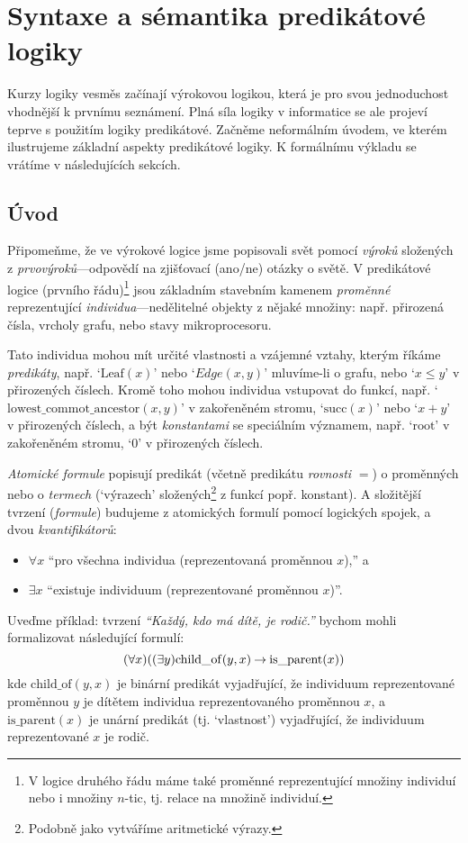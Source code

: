 \chapter{Syntaxe a sémantika predikátové logiky}

Kurzy logiky vesměs začínají výrokovou logikou, která je pro svou jednoduchost vhodnější k prvnímu seznámení. Plná síla logiky v informatice se ale projeví teprve s použitím logiky predikátové.
Začněme neformálním úvodem, ve kterém ilustrujeme základní aspekty predikátové logiky. K formálnímu výkladu se vrátíme v následujících sekcích.

\section{Úvod}
Připomeňme, že ve výrokové logice jsme popisovali svět pomocí \emph{výroků} složených z \emph{prvovýroků}---odpovědí na zjišťovací (ano/ne) otázky o světě. V predikátové logice (prvního řádu)\footnote{V logice druhého řádu máme také proměnné reprezentující množiny individuí nebo i množiny $n$-tic, tj. relace na množině individuí.} jsou základním stavebním kamenem \emph{proměnné} reprezentující \emph{individua}---nedělitelné objekty z nějaké množiny: např. přirozená čísla, vrcholy grafu, nebo stavy mikroprocesoru. 

Tato individua mohou mít určité vlastnosti a vzájemné vztahy, kterým říkáme \emph{predikáty}, např. `$\mathrm{Leaf}(x)$' nebo `$Edge(x,y)$' mluvíme-li o grafu, nebo `$x\leq y$' v přirozených číslech. Kromě toho mohou individua vstupovat do funkcí, např. `$\mathrm{lowest\_commot\_ancestor}(x,y)$' v zakořeněném stromu, `$\mathrm{succ}(x)$' nebo `$x+y$' v přirozených číslech, a být \emph{konstantami} se speciálním významem, např. `$\mathrm{root}$' v zakořeněném stromu, `$0$' v přirozených číslech. 

\emph{Atomické formule} popisují predikát (včetně predikátu \emph{rovnosti} $=$) o proměnných nebo o \emph{termech} (`výrazech' složených\footnote{Podobně jako vytváříme aritmetické výrazy.} z funkcí popř. konstant). A složitější tvrzení (\emph{formule}) budujeme z atomických formulí pomocí logických spojek, a dvou \emph{kvantifikátorů}: 
\begin{itemize}
    \item $\forall x$ ``pro všechna individua (reprezentovaná proměnnou $x$),'' a
    \item $\exists x$ ``existuje individuum (reprezentované proměnnou $x$)''.
\end{itemize}
Uveďme příklad: tvrzení \textit{``Každý, kdo má dítě, je rodič.''} bychom mohli formalizovat následující formulí:
$$
(\forall x)((\exists y)\mathrm{child\_of}(y,x)\mathbin{\rightarrow}\mathrm{is\_parent}(x))
$$
kde $\mathrm{child\_of}(y,x)$ je binární predikát vyjadřující, že individuum reprezentované proměnnou $y$ je dítětem individua reprezentovaného proměnnou $x$, a $\mathrm{is\_parent}(x)$ je unární predikát (tj. `vlastnost') vyjadřující, že individuum reprezentované $x$ je rodič.

